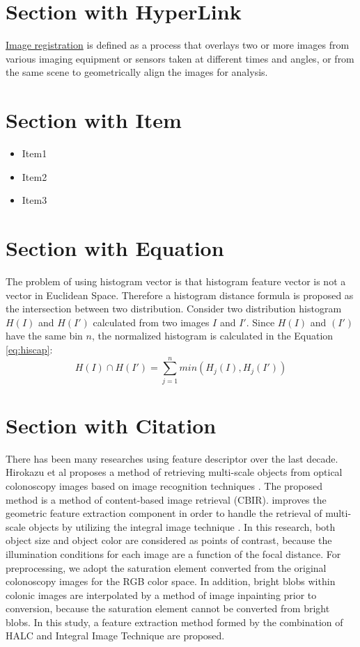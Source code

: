 \documentclass{article}
\begin{document}
	\section{Section with HyperLink}
	\href{https://www.sciencedirect.com/topics/medicine-and-dentistry/image-registration}{Image registration} is defined as a process that overlays two or more images from various imaging equipment or sensors taken at different times and angles, or from the same scene to geometrically align the images for analysis. 
	\section{Section with Item}
	\begin{itemize}
		\item Item1
		\item Item2
		\item Item3
	\end{itemize}
	\section{Section with Equation}
	The problem of using histogram vector is that histogram feature vector is not a vector in Euclidean Space. Therefore a histogram distance formula is proposed as the intersection between two distribution. Consider two distribution histogram $H(I)$ and $H(I\prime)$ calculated from two images $I$ and $I\prime$. Since $H(I)$ and $(I\prime)$ have the same bin $n$, the normalized histogram is calculated in the Equation \ref{eq:hiscap}:
	\begin{equation}
		H(I) \cap H(I\prime) = \sum_{j = 1}^{n}min(H_j(I), H_j(I\prime))
		\label{eq:hiscap}
	\end{equation}
	\section{Section with Citation}
	There has been many researches using feature descriptor over the last decade. Hirokazu et al proposes a method of retrieving multi-scale objects from optical colonoscopy images based on image recognition techniques \cite{7348442}. The proposed method is a method of content-based image retrieval (CBIR). \cite{7348442} improves the geometric feature extraction component in order to handle the retrieval of multi-scale objects	by utilizing the integral image technique \cite{207-212}. In this research, both object size and	object color are considered as points of contrast, because the illumination conditions for each image are a function of the focal distance. For preprocessing, we adopt the saturation element converted from the original colonoscopy images for the	RGB color space. In addition, bright blobs within colonic
	images are interpolated by a method of image inpainting \cite{25-36}
	prior to conversion, because the saturation element cannot be
	converted from bright blobs. In this study, a feature extraction method formed by the combination of HALC \cite{halc} and Integral Image Technique \cite{25-36} are proposed. 
\end{document}

